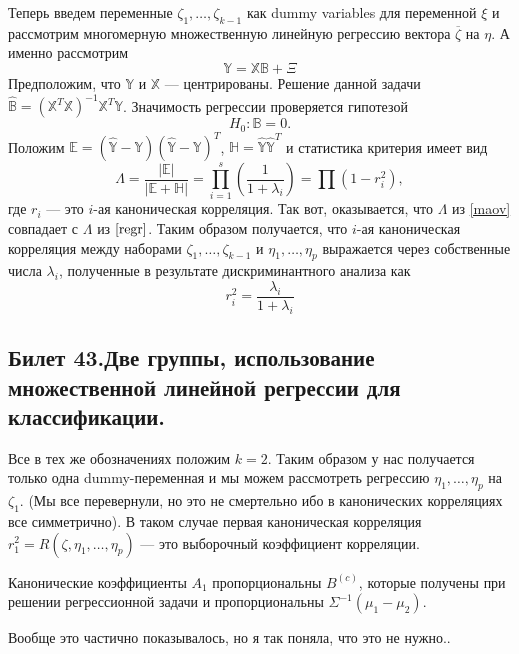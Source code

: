 Теперь введем переменные $\zeta_1, \ldots, \zeta_{k-1}$ как dummy variables для переменной $\xi$ и рассмотрим многомерную множественную линейную регрессию вектора $\overline{\zeta}$ на $\eta$.
А именно рассмотрим
\begin{equation*}
\mathbb{Y} = \mathbb{X}\mathbb{B} + \Xi
\end{equation*}
Предположим, что $\mathbb{Y}$ и $\mathbb{X}$ --- центрированы.
Решение данной задачи $\hat{\mathbb{B}} = (\mathbb{X}^T\mathbb{X})^{-1}\mathbb{X}^T \mathbb{Y}$.
Значимость регрессии проверяется гипотезой
\begin{equation*}
H_0: \mathbb{B} = 0.
\end{equation*}
Положим $\mathbb{E} = (\hat{\mathbb{Y}} - \mathbb{Y})(\hat{\mathbb{Y}} - \mathbb{Y})^T$,
$\mathbb{H} = \hat{\mathbb{Y}}\hat{\mathbb{Y}} ^T$ и статистика критерия имеет вид
\begin{equation}
\Lambda = \frac{|\mathbb{E}|}{|\mathbb{E} + \mathbb{H}|} = \prod\limits_{i = 1}^s \left(\frac{1}{1 + \lambda_i}\right) = \prod(1 - r^2_i),
\label{regr}
\end{equation}
где $r_i$ --- это $i$-ая каноническая корреляция.
Так вот, оказывается, что $\Lambda$ из \eqref{maov} совпадает с  $\Lambda$ из $\eqref{regr}$.
Таким образом получается, что $i$-ая каноническая корреляция между наборами $\zeta_1, \ldots, \zeta_{k-1}$ и $\eta_1, \ldots, \eta_p$ выражается через собственные числа $\lambda_i$, полученные в результате дискриминантного анализа как
\begin{equation*}
r_i^2 = \frac{\lambda_i}{1 + \lambda_i}
\end{equation*}
\subsection{Билет 43.Две группы, использование	множественной линейной регрессии для классификации.}
Все в тех же обозначениях положим $k = 2$. Таким образом у нас получается только одна dummy-переменная и мы можем рассмотреть регрессию $\eta_1, \ldots, \eta_p$ на $\zeta_1$.
(Мы все перевернули, но это не смертельно ибо в канонических корреляциях все симметрично).
В таком случае первая каноническая корреляция $r^2_1 = R(\zeta, \eta_1, \ldots, \eta_p)$ --- это выборочный коэффициент корреляции.

\begin{thm}
Канонические коэффициенты $A_1$ пропорциональны $B^{(c)}$, которые получены при решении регрессионной задачи и пропорциональны $\Sigma^{-1}(\mu_1 - \mu_2)$.
\end{thm}
Вообще это частично показывалось, но я так поняла, что это не нужно..
